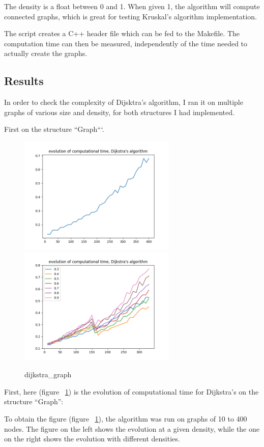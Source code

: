 \documentclass{article}
\begin{document}
The density is a float between 0 and 1. When given 1, the algorithm will compute connected graphs, which is great for testing Kruskal's algorithm implementation.

The script creates a C++ header file which can be fed to the Makefile. The computation time can then be measured, independently of the time needed to actually create the graphs.

\subsection{Results}

In order to check the complexity of Dijsktra's algorithm, I ran it on multiple graphs of various size and density, for both structures I had implemented.

First on the structure ``Graph```.

\begin{figure}[!h]
	\centering
	\includegraphics[width=7.5cm]{ressources/dijkstra_res_graph.png}
	\includegraphics[width=7.5cm]{ressources/dijkstra_res_graph_density.png}
	\caption{dijkstra\_graph}
	\label{fig:dijkstra}
\end{figure}

First, here (figure ~\ref{fig:dijkstra}) is the evolution of computational time for Dijkstra's on the
structure ``Graph'':

To obtain the figure (figure ~\ref{fig:dijkstra}), the algorithm was run on graphs of 10 to 400 nodes. The figure on the left shows the evolution at a given density, while the one on the right shows the evolution with different densities.
\end{document}
